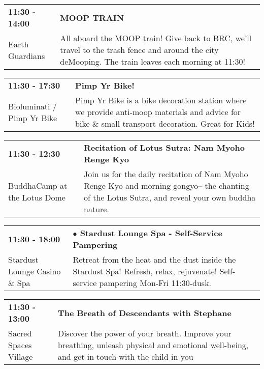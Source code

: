 \begin{tabular}{ p{1in} p{2.2in} }
    \textbf{11:30 - 14:00} & \textbf{MOOP TRAIN } \\
    Earth Guardians \newline  & All aboard the MOOP train! Give back to BRC, we'll travel to the trash fence and around the city deMooping. The train leaves each morning at 11:30! \\
    \hline 
\end{tabular}
    
\begin{tabular}{ p{1in} p{2.2in} }
    \textbf{11:30 - 17:30} & \textbf{Pimp Yr Bike!} \\
    Bioluminati / Pimp Yr Bike \newline  & Pimp Yr Bike is a bike decoration station where we provide anti-moop materials and advice for bike \& small transport decoration. Great for Kids! \\
    \hline 
\end{tabular}
    
\begin{tabular}{ p{1in} p{2.2in} }
    \textbf{11:30 - 12:30} & \textbf{Recitation of Lotus Sutra: Nam Myoho Renge Kyo} \\
    BuddhaCamp at the Lotus Dome \newline  & Join us for the daily recitation of Nam Myoho Renge Kyo and morning gongyo-- the chanting of the Lotus Sutra, and reveal your own buddha nature. \\
    \hline 
\end{tabular}
    
\begin{tabular}{ p{1in} p{2.2in} }
    \textbf{11:30 - 18:00} & \textbf{$\bullet$	Stardust Lounge Spa - Self-Service Pampering} \\
    Stardust Lounge Casino \& Spa \newline  & Retreat from the heat and the dust inside the Stardust Spa! Refresh, relax, rejuvenate! Self-service pampering Mon-Fri 11:30-dusk. \\
    \hline 
\end{tabular}
    
\begin{tabular}{ p{1in} p{2.2in} }
    \textbf{11:30 - 13:00} & \textbf{The Breath of Descendants with Stephane} \\
    Sacred Spaces Village \newline  & Discover the power of your breath. Improve your breathing, unleash physical and emotional well-being, and get in touch with the child in you \\
    \hline 
\end{tabular}
    
